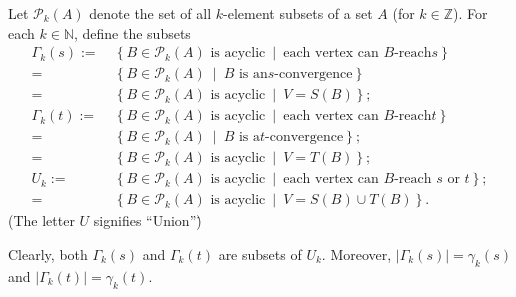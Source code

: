 \documentclass[numbers=enddot,12pt,final,onecolumn,notitlepage]{scrartcl}%
\theoremstyle{definition}
\theoremstyle{plainsl}
\begin{document}
Let $\mathcal{P}_{k}\left(  A\right)  $ denote the set of all $k$-element
subsets of a set $A$ (for $k\in\mathbb{Z}$). For each $k\in\mathbb{N}$, define
the subsets
\begin{align*}
\Gamma_{k}\left(  s\right)  :=  &  \ \left\{  B\in\mathcal{P}_{k}\left(
A\right)  \text{ is acyclic}\ \mid\ \text{each vertex can }B\text{-reach
}s\right\} \\
=  &  \ \left\{  B\in\mathcal{P}_{k}\left(  A\right)  \ \mid\ B\text{ is an
}s\text{-convergence}\right\} \\
=  &  \ \left\{  B\in\mathcal{P}_{k}\left(  A\right)  \text{ is acyclic}
\ \mid\ V=S\left(
B\right)  \right\}  ;\\
\Gamma_{k}\left(  t\right)  :=  &  \ \left\{  B\in\mathcal{P}_{k}\left(
A\right)  \text{ is acyclic}\ \mid\ \text{each vertex can }B\text{-reach
}t\right\} \\
=  &  \ \left\{  B\in\mathcal{P}_{k}\left(  A\right)  \ \mid\ B\text{ is a
}t\text{-convergence}\right\}  ;\\
=  &  \ \left\{  B\in\mathcal{P}_{k}\left(  A\right)  \text{ is acyclic}
\ \mid\ V=T\left(
B\right)  \right\}  ;\\
U_{k}:=  &  \ \left\{  B\in\mathcal{P}_{k}\left(  A\right)  \text{ is
acyclic}\ \mid\ \text{each vertex can }B\text{-reach }s\text{ or }t\right\}
;\\
=  &  \ \left\{  B\in\mathcal{P}_{k}\left(  A\right)  \text{ is acyclic}
\ \mid\ V=S\left(
B\right)  \cup T\left(  B\right)  \right\} .
\end{align*}
(The letter $U$ signifies \textquotedblleft Union\textquotedblright\.)


Clearly, both $\Gamma_{k}\left(  s\right)  $ and $\Gamma_{k}\left(  t\right)
$ are subsets of $U_{k}$. Moreover, $\left\vert \Gamma_{k}\left(  s\right)
\right\vert =\gamma_{k}\left(  s\right)  $ and $\left\vert \Gamma_{k}\left(
t\right)  \right\vert =\gamma_{k}\left(  t\right)  $.
\end{document}

